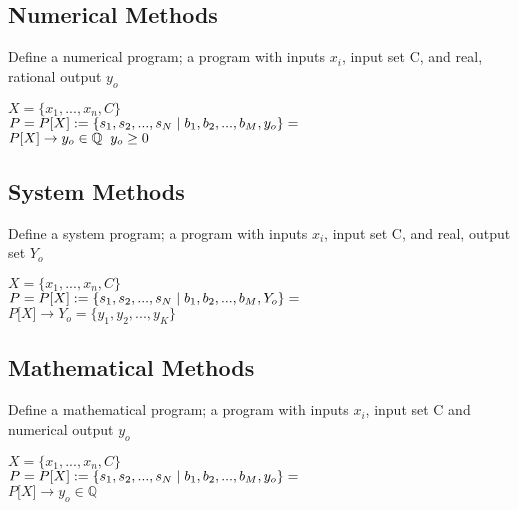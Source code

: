 \documentclass[11pt]{article}
\begin{document}
\subsection{Numerical Methods}
Define a numerical program; a program with inputs $x_i$, input set C, and real, rational output $y_o$
\begin{center}
$
X = \{x_1,...,x_n,C\}
$
\\ \vspace{2mm}
$P = P\lbrack X \rbrack := \{ s_1,s_2,...,s_{N}\hspace{1mm}|\hspace{1mm} b_1, b_2,...,b_M,y_o\}=$
\\ \vspace{2mm}
$
P\lbrack X \rbrack \rightarrow y_o \in \mathbb{Q} \hspace{2mm} y_o \geq 0
$
\end{center}





\subsection{System Methods}
Define a system program; a program with inputs $x_i$, input set C, and real, output set $Y_o$
\begin{center}
$
X = \{x_1,...,x_n,C\}
$
\\ \vspace{2mm}
$P = P\lbrack X \rbrack := \{ s_1,s_2,...,s_{N}\hspace{1mm}|\hspace{1mm} b_1, b_2,...,b_M,Y_o\}=$
\\ \vspace{2mm}
$
P\lbrack X \rbrack \rightarrow Y_o = \{y_1,y_2,...,y_K\}
$
\end{center}





\subsection{Mathematical Methods}
Define a mathematical program; a program with inputs $x_i$, input set C and numerical output $y_o$
\begin{center}
$
X = \{x_1,...,x_n,C\}
$
\\ \vspace{2mm}
$P = P\lbrack X \rbrack := \{ s_1,s_2,...,s_{N}\hspace{1mm}|\hspace{1mm} b_1, b_2,...,b_M,y_o\}=$
\\ \vspace{2mm}
$
P\lbrack X \rbrack \rightarrow y_o \in \mathbb{Q}
$
\end{center}
\end{document}
